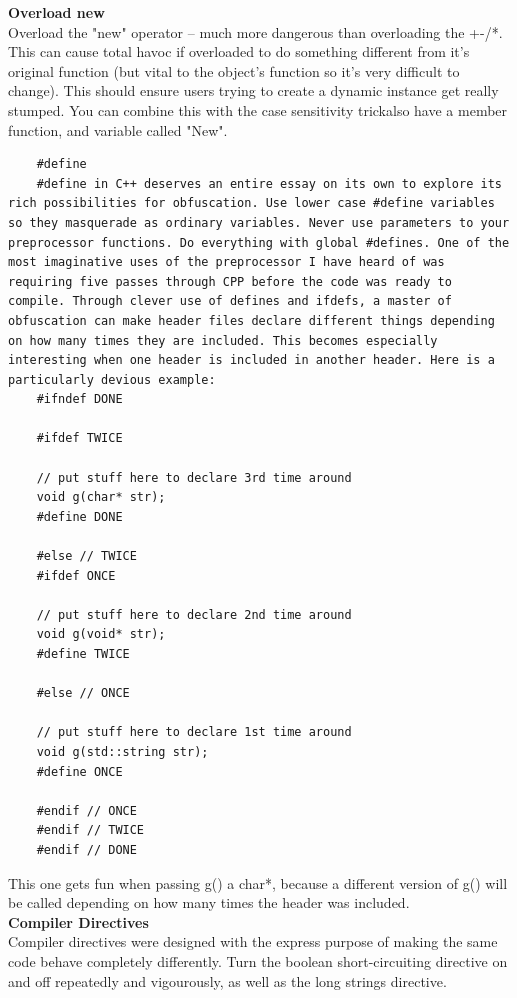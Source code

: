 \documentclass[11pt,twoside,a4paper]{article}
\begin{document}
\textbf{Overload new}~\\
Overload the "new" operator -- much more dangerous than overloading the +-/*. This can cause total havoc if overloaded to do something different from it's original function (but vital to the object's function so it's very difficult to change). This should ensure users trying to create a dynamic instance get really stumped. You can combine this with the case sensitivity trickalso have a member function, and variable called "New".~\\ 
\begin{verbatim}
	#define
	#define in C++ deserves an entire essay on its own to explore its rich possibilities for obfuscation. Use lower case #define variables so they masquerade as ordinary variables. Never use parameters to your preprocessor functions. Do everything with global #defines. One of the most imaginative uses of the preprocessor I have heard of was requiring five passes through CPP before the code was ready to compile. Through clever use of defines and ifdefs, a master of obfuscation can make header files declare different things depending on how many times they are included. This becomes especially interesting when one header is included in another header. Here is a particularly devious example: 
	#ifndef DONE 
	
	#ifdef TWICE 
	
	// put stuff here to declare 3rd time around 
	void g(char* str); 
	#define DONE 
	
	#else // TWICE 
	#ifdef ONCE 
	
	// put stuff here to declare 2nd time around 
	void g(void* str); 
	#define TWICE 
	
	#else // ONCE 
	
	// put stuff here to declare 1st time around 
	void g(std::string str); 
	#define ONCE 
	
	#endif // ONCE 
	#endif // TWICE 
	#endif // DONE
\end{verbatim}
This one gets fun when passing g() a char*, because a different version of g() will be called depending on how many times the header was included.~\\ 

\textbf{Compiler Directives}~\\
Compiler directives were designed with the express purpose of making the same code behave completely differently. Turn the boolean short-circuiting directive on and off repeatedly and vigourously, as well as the long strings directive.~\\ 
\end{document}
